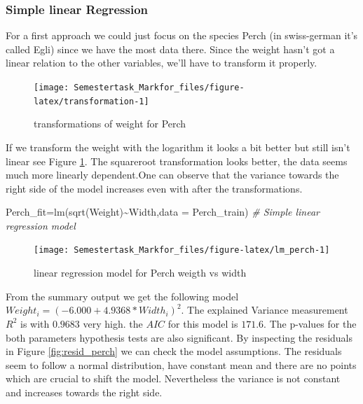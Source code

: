 \documentclass[
]{article}
\newenvironment{Shaded}{\begin{snugshade}}{\end{snugshade}}
\newcommand{\AttributeTok}[1]{\textcolor[rgb]{0.77,0.63,0.00}{#1}}
\newcommand{\CommentTok}[1]{\textcolor[rgb]{0.56,0.35,0.01}{\textit{#1}}}
\newcommand{\FunctionTok}[1]{\textcolor[rgb]{0.00,0.00,0.00}{#1}}
\newcommand{\NormalTok}[1]{#1}
\newcommand{\OtherTok}[1]{\textcolor[rgb]{0.56,0.35,0.01}{#1}}
\newcommand{\SpecialCharTok}[1]{\textcolor[rgb]{0.00,0.00,0.00}{#1}}
\begin{document}
\hypertarget{simple-linear-regression}{%
\subsubsection{Simple linear
Regression}\label{simple-linear-regression}}

For a first approach we could just focus on the species Perch (in
swiss-german it's called Egli) since we have the most data there. Since
the weight hasn't got a linear relation to the other variables, we'll
have to transform it properly.

\begin{figure}

{\centering \texttt{[image: Semestertask\_Markfor\_files/figure-latex/transformation-1]} 

}

\caption{transformations of weight for Perch}\label{fig:transformation}
\end{figure}

If we transform the weight with the logarithm it looks a bit better but
still isn't linear see Figure \ref{fig:transformation}. The squareroot
transformation looks better, the data seems much more linearly
dependent.One can observe that the variance towards the right side of
the model increases even with after the transformations.

\begin{Shaded}
\begin{Highlighting}[]
\NormalTok{Perch\_fit}\OtherTok{=}\FunctionTok{lm}\NormalTok{(}\FunctionTok{sqrt}\NormalTok{(Weight)}\SpecialCharTok{\textasciitilde{}}\NormalTok{Width,}\AttributeTok{data =}\NormalTok{ Perch\_train) }\CommentTok{\#  Simple linear regression model}
\end{Highlighting}
\end{Shaded}

\begin{figure}

{\centering \texttt{[image: Semestertask\_Markfor\_files/figure-latex/lm\_perch-1]} 

}

\caption{linear regression model for Perch weigth vs width}\label{fig:lm_perch}
\end{figure}

From the summary output we get the following model
\(Weight_{i}=(-6.000 + 4.9368 * Width_{i})^{2}\). The explained Variance
measurement \(R^{2}\) is with \(0.9683\) very high. the \(AIC\) for this
model is \(171.6\). The p-values for the both parameters hypothesis
tests are also significant. By inspecting the residuals in Figure
\ref{fig:resid_perch} we can check the model assumptions. The residuals
seem to follow a normal distribution, have constant mean and there are
no points which are crucial to shift the model. Nevertheless the
variance is not constant and increases towards the right side.
\end{document}
